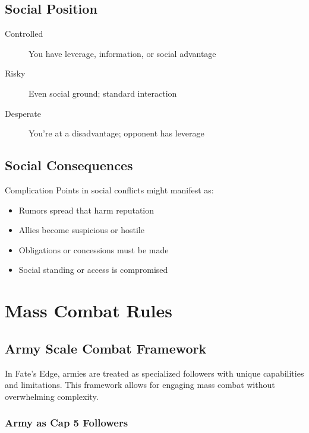 \subsection{Social Position}

\begin{description}
\item[Controlled] You have leverage, information, or social advantage
\item[Risky] Even social ground; standard interaction
\item[Desperate] You're at a disadvantage; opponent has leverage
\end{description}

\subsection{Social Consequences}

Complication Points in social conflicts might manifest as:
\begin{itemize}
\item Rumors spread that harm reputation
\item Allies become suspicious or hostile
\item Obligations or concessions must be made
\item Social standing or access is compromised
\end{itemize}

\section{Mass Combat Rules}

\subsection{Army Scale Combat Framework}

In Fate's Edge, armies are treated as specialized followers with unique capabilities and limitations. This framework allows for engaging mass combat without overwhelming complexity.

\subsubsection{Army as Cap 5 Followers}

